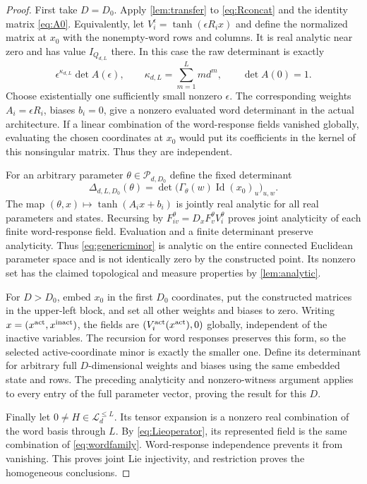 \documentclass[11pt,a4paper]{article}
\numberwithin{equation}{section}
\theoremstyle{definition}
\theoremstyle{remark}
\DeclareMathOperator{\Id}{Id}
\newcommand{\Lie}{\mathcal L}
\begin{document}
\begin{proof}
First take $D=D_0$. Apply \cref{lem:transfer} to \eqref{eq:Rconcat} and
the identity matrix \eqref{eq:A0}. Equivalently, let
$V_i^\epsilon=\tanh(\epsilon R_ix)$ and define the normalized matrix
at $x_0$ with the nonempty-word rows and columns. It is real analytic
near zero and has value $I_{Q_{d,L}}$ there. In this case the raw
determinant is exactly
\begin{equation}\label{eq:rawdet}
 \epsilon^{\kappa_{d,L}}\det A(\epsilon),\qquad
 \kappa_{d,L}=\sum_{m=1}^L m d^m,
 \qquad \det A(0)=1.
\end{equation}
Choose existentially one sufficiently small nonzero $\epsilon$.
The corresponding weights $A_i=\epsilon R_i$, biases $b_i=0$, give
a nonzero evaluated word determinant in the actual architecture.
If a linear combination of the word-response fields vanished globally,
evaluating the chosen coordinates at $x_0$ would put its coefficients
in the kernel of this nonsingular matrix. Thus they are independent.

For an arbitrary parameter $\theta\in\mathcal P_{d,D_0}$ define the
fixed determinant
\begin{equation}\label{eq:genericminor}
 \Delta_{d,L,D_0}(\theta)=
 \det\bigl(\Gamma_\theta(w)\Id(x_0)_u\bigr)_{u,w}.
\end{equation}
The map $(\theta,x)\mapsto\tanh(A_ix+b_i)$ is jointly real analytic
for all real parameters and states. Recursing by
$F_{iv}^\theta=D_xF_v^\theta V_i^\theta$ proves joint analyticity
of each finite word-response field. Evaluation and a finite determinant
preserve analyticity. Thus \eqref{eq:genericminor} is analytic on the
entire connected Euclidean parameter space and is not identically zero
by the constructed point. Its nonzero set has the claimed topological
and measure properties by \cref{lem:analytic}.

For $D>D_0$, embed $x_0$ in the first $D_0$ coordinates, put the
constructed matrices in the upper-left block, and set all other weights
and biases to zero. Writing $x=(x^{\rm act},x^{\rm inact})$, the fields
are $(V_i^{\rm act}(x^{\rm act}),0)$ globally, independent of the
inactive variables. The recursion for word responses preserves this
form, so the selected active-coordinate minor is exactly the smaller
one. Define its determinant for arbitrary full $D$-dimensional weights
and biases using the same embedded state and rows. The preceding
analyticity and nonzero-witness argument applies to every entry of
the full parameter vector, proving the result for this $D$.

Finally let $0\ne H\in\Lie_d^{\leq L}$. Its tensor expansion is a
nonzero real combination of the word basis through $L$. By
\eqref{eq:Lieoperator}, its represented field is the same combination
of \eqref{eq:wordfamily}. Word-response independence prevents it from
vanishing. This proves joint Lie injectivity, and restriction proves
the homogeneous conclusions.
\end{proof}
\end{document}
